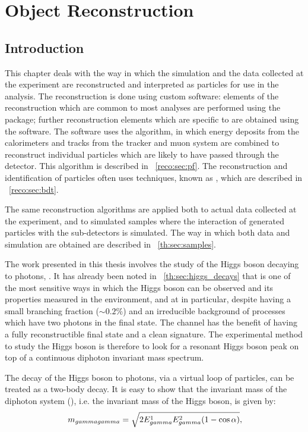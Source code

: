 \chapter{Object Reconstruction}
\label{chap:reconstruction}

\section{Introduction}
\label{reco:sec:intro}

This chapter deals with the way in which the simulation and the data collected at the \CMS experiment are reconstructed and interpreted as particles for use in the \Hgg analysis. The reconstruction is done using custom software: elements of the reconstruction which are common to most analyses are performed using the \CMSSW package; further reconstruction elements which are specific to \Hgg are obtained using the \FLASHgg software. The \CMSSW software uses the \PF algorithm, in which energy deposits from the calorimeters and tracks from the tracker and muon system are combined to reconstruct individual particles which are likely to have passed through the detector. This algorithm is described in \Sec~\ref{reco:sec:pf}. The reconstruction and identification of particles often uses \MVA techniques, known as \BDT\s, which are described in \Sec~\ref{reco:sec:bdt}. 

The same reconstruction algorithms are applied both to actual data collected at the \CMS experiment, and to simulated samples where the interaction of generated particles with the \CMS sub-detectors is simulated. The way in which both data and simulation are obtained are described in \Sec~\ref{th:sec:samples}.

The work presented in this thesis involves the study of the Higgs boson decaying to photons, \Hgg. It has already been noted in \Sec~\ref{th:sec:higgs_decays} that \Hgg is one of the most sensitive ways in which the Higgs boson can be observed and its properties measured in the \LHC environment, and at \CMS in particular, despite having a small branching fraction ($\sim 0.2\% $) and an irreducible \SM background of \QCD processes which have two photons in the final state. The channel has the benefit of having a fully reconstructible final state and a clean signature. The experimental method to study the Higgs boson is therefore to look for a resonant Higgs boson peak on top of a continuous diphoton invariant mass spectrum.


The decay of the Higgs boson to photons, via a virtual loop of particles, can be treated as a two-body decay. It is easy to show that the invariant mass of the diphoton system (\mgg), i.e. the invariant mass of the Higgs boson, is given by:
\begin{equation}
\label{reco:eq:mgg}
 \,m_{gammagamma} = \sqrt{2 E_{gamma}^1 E_{gamma}^2 (1-\cos\alpha)}, 
\end{equation}

